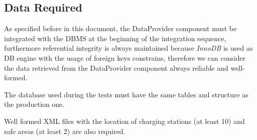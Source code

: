 \subsection{Data Required}
As specified before in this document, the DataProvider component must be integrated with the DBMS at the beginning of the integration sequence, furthermore referential integrity is always maintained because \emph{InnoDB} is used as DB engine with the usage of foreign keys constrains, therefore we can consider the data retrieved from the DataProvider component always reliable and well-formed.

The database used during the tests must have the same tables and structure as the production one.

Well formed XML files with the location of charging stations (at least 10) and safe areas (at least 2) are also required.

